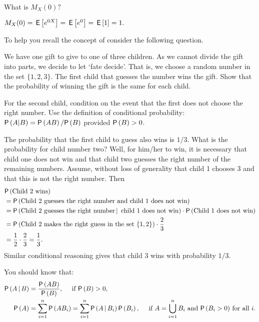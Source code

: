 \begin{exercise}%
  What is $M_X(0)?$
  \begin{solution}
    $M_X(0) = \,\mathsf{E}\left[e^{0 X}\right] = \,\mathsf{E}\left[e^0\right] = \,\mathsf{E}\left[1\right] = 1.$
  \end{solution}
\end{exercise}

To help you recall the concept of  consider the following question.
\begin{exercise}%
  We have  one gift to give to one of three children. As we cannot
  divide the gift into parts, we decide to let `fate decide'. That
  is, we choose a random number in the set $\{1, 2, 3\}$. The first
  child that guesses the number wins the gift. Show that the
  probability of winning the gift is the same for each child.
  \begin{hint}
    For the second child, condition on the event that the first does not choose the right number.
    Use the definition of conditional probability:
    $\P{A|B} = \P{AB}/\P{B}$ provided $\P{B}>0$.
  \end{hint}
\begin{solution}
    The probability that the first child to guess also wins is
    $1/3$. What is the probability for child number two? Well, for
    him/her to win, it is necessary that child one does not win and
    that child two guesses the right number of the remaining
    numbers. Assume, without loss of generality that child 1 chooses
    $3$ and that this is not the right number. Then 
    \begin{equation*}
      \begin{split}
&\P{\text{Child  2 wins}} \\
&= \P{\text{Child 2 guesses the right number and child 1 does not win}} \\
&= \P{\text{Child 2 guesses the right number} \given \text{ child 1 does not win}}
\cdot \P{\text{Child 1 does not win}} \\
&= \P{\text{Child 2 makes the right guess in the set $\{1,2\}$}}\cdot \frac 23 \\
&= \frac 1 2\cdot \frac 23  = \frac 1 3.
      \end{split}
    \end{equation*}
    Similar conditional reasoning gives that child 3 wins with probability $1/3$. 
  \end{solution}
\end{exercise}

You should know that:
\begin{subequations}
\begin{align}
\P{A\given B} & = \frac{\P{AB}}{\P{B}}, \quad\text{ if } \P{B}>0, \\
  \P{A} &= \sum_{i=1}^n \P{A B_i} = \sum_{i=1}^n \P{A\given B_i} \P{B_i}, \quad\text{ if  $A=\bigcup_{i=1}^n B_i$ and $\P{B_i>0}$ for all $i$}. \label{eq:70}
\end{align}
\end{subequations}


